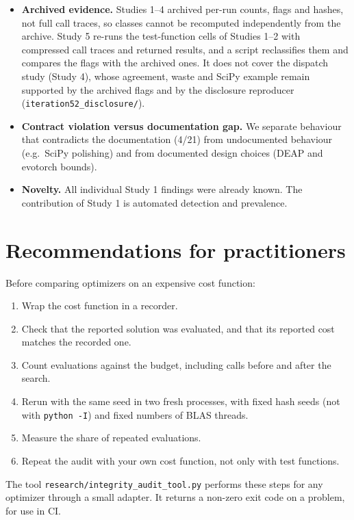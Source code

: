 \documentclass[acmsmall,screen,review,anonymous=false]{acmart}
\providecommand{\tightlist}{\setlength{\itemsep}{0pt}\setlength{\parskip}{0pt}}
\begin{document}
\begin{itemize}
  checks must fix thread counts as well as seeds.
\item
  \textbf{Archived evidence.} Studies 1--4 archived per-run counts, flags and hashes, not full call traces, so classes
  cannot be recomputed independently from the archive. Study 5 re-runs the test-function cells of Studies 1--2 with
  compressed call traces and returned results, and a script reclassifies them and compares the flags with the
  archived ones. It does not cover the dispatch study (Study 4), whose agreement, waste and SciPy example remain
  supported by the archived flags and by the disclosure reproducer (\texttt{iteration52\_\allowbreak{}disclosure/}).
\item
  \textbf{Contract violation versus documentation gap.} We separate behaviour that contradicts the documentation (4/21)
  from undocumented behaviour (e.g.~SciPy polishing) and from documented design choices (DEAP and evotorch bounds).
\item
  \textbf{Novelty.} All individual Study 1 findings were already known. The contribution of Study 1 is automated
  detection and prevalence.
\end{itemize}

\section{Recommendations for practitioners}\label{recommendations-for-practitioners}

Before comparing optimizers on an expensive cost function:

\begin{enumerate}
\def\labelenumi{\arabic{enumi}.}
\tightlist
\item
  Wrap the cost function in a recorder.
\item
  Check that the reported solution was evaluated, and that its reported cost matches the recorded one.
\item
  Count evaluations against the budget, including calls before and after the search.
\item
  Rerun with the same seed in two fresh processes, with fixed hash seeds (not with \texttt{python\ -I}) and fixed numbers of
  BLAS threads.
\item
  Measure the share of repeated evaluations.
\item
  Repeat the audit with your own cost function, not only with test functions.
\end{enumerate}

The tool \texttt{research/\allowbreak{}integrity\_\allowbreak{}audit\_\allowbreak{}tool.\allowbreak{}py} performs these steps for any optimizer through a small adapter. It
returns a non-zero exit code on a problem, for use in CI.
\end{document}
